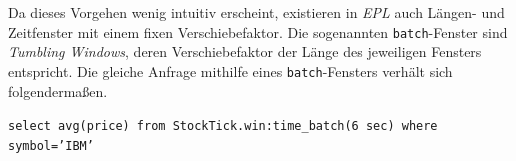 \documentclass{acm_proc_article-sp}
\begin{document}
\begin{table}[ht]
    \caption{Fenster ohne Verschiebefaktor}
    \label{table:wo_factor}\vspace{0.2cm}
\end{table}

Da dieses Vorgehen wenig intuitiv erscheint, existieren in \textit{EPL} auch Längen- und 
Zeitfenster mit einem fixen Verschiebefaktor. Die sogenannten \texttt{batch}-Fenster sind 
\textit{Tumbling Windows}, deren Verschiebefaktor der Länge des jeweiligen Fensters 
entspricht. Die gleiche Anfrage mithilfe eines \texttt{batch}-Fensters verhält sich 
folgendermaßen.

\texttt{select  avg(price) from StockTick.win:time\_batch(6 sec) where symbol='IBM'}

\begin{table}[ht]
    \caption{\texttt{batch}-Fenster}
    \label{table:ereignis-batch}\vspace{0.2cm}
\end{table}
\end{document}
